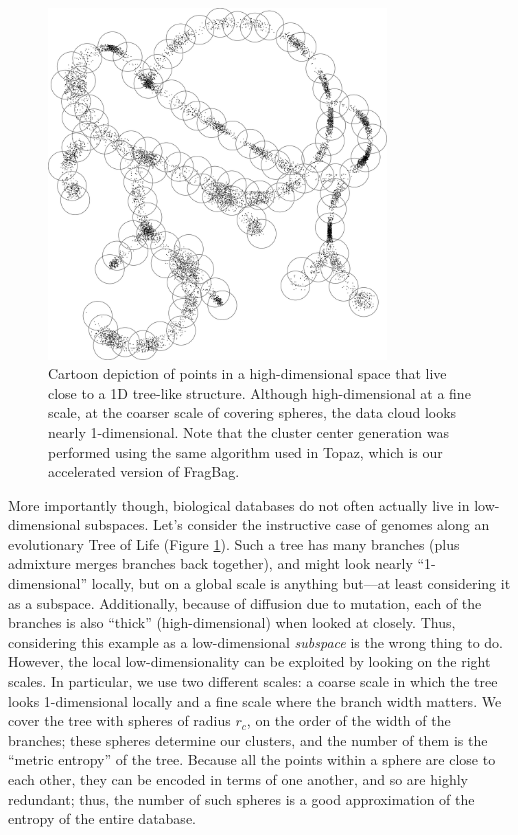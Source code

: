 \documentclass[review,preprint,12pt]{elsarticle}
\theoremstyle{definition}
\theoremstyle{remark}
\numberwithin{equation}{section}
\begin{document}
\begin{figure}[btp]
    \centering
    \includegraphics[width=0.8\textwidth]{assets/treepoints/treepoints2D_clusters.png}
    \caption{Cartoon depiction of points in a high-dimensional space that live close to a 1D tree-like structure. Although high-dimensional at a fine scale, at the coarser scale of covering spheres, the data cloud looks nearly 1-dimensional. Note that the cluster center generation was performed using the same algorithm used in Topaz, which is our accelerated version of FragBag.}
    \label{fig:tree}
\end{figure}
More importantly though, biological databases do not often actually live in low-dimensional subspaces.
Let's consider the instructive case of genomes along an evolutionary Tree of Life (Figure \ref{fig:tree}).
Such a tree has many branches (plus admixture merges branches back together), and might look nearly ``1-dimensional'' locally, but on a global scale is anything but---at least considering it as a subspace.
Additionally, because of diffusion due to mutation, each of the branches is also ``thick'' (high-dimensional) when looked at closely.
Thus, considering this example as a low-dimensional \textit{subspace} is the wrong thing to do.
However, the local low-dimensionality can be exploited by looking on the right scales.
In particular, we use two different scales: a coarse scale in which the tree looks 1-dimensional locally and a fine scale where the branch width matters.
We cover the tree with spheres of radius $r_c$, on the order of the width of the branches; these spheres determine our clusters, and the number of them is the ``metric entropy'' of the tree.
Because all the points within a sphere are close to each other, they can be encoded in terms of one another, and so are highly redundant; thus, the number of such spheres is a good approximation of the entropy of the entire database.
\end{document}
